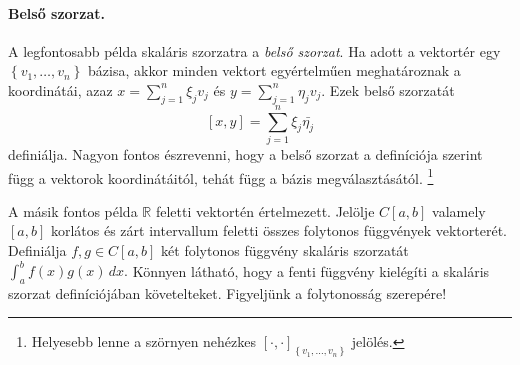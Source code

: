 \documentclass[a4paper, showtrims]{memoir}
\theoremstyle{plain}
\theoremstyle{remark}
\theoremstyle{definition}
\begin{document}
\paragraph{Belső szorzat.} A legfontosabb példa skaláris szorzatra a \emph{belső szorzat}.
Ha adott a vektortér egy $\left\{ v_1,\ldots,v_n \right\}$ bázisa,
akkor minden vektort egyértelműen meghatároznak a koordinátái,
azaz
\begin{math}
	x=\sum_{j=1}^n\xi_jv_j
\end{math}
és
\begin{math}
	y=\sum_{j=1}^n\eta_jv_j.
\end{math}
Ezek belső szorzatát
\begin{displaymath}
	\left[ x,y \right]=\sum_{j=1}^n\xi_j\bar{\eta_j}
\end{displaymath}
definiálja.
Nagyon fontos észrevenni,
hogy a belső szorzat a definíciója szerint függ a vektorok koordinátáitól,
tehát függ a bázis megválasztásától.%
\footnote{
	Helyesebb lenne a szörnyen nehézkes
	$\left[ \cdot,\cdot \right]_{\left\{ v_1,\ldots,v_n \right\}}$ jelölés.
}

A másik fontos példa $\mathbb{R}$ feletti vektortén értelmezett.
Jelölje $C\left[ a,b \right]$ valamely $\left[ a,b \right]$ korlátos és zárt intervallum feletti összes folytonos függvények vektorterét.
Definiálja $f,g\in C\left[ a,b \right]$ két folytonos függvény skaláris szorzatát
\begin{math}
	\int_{a}^{b}f\left( x \right)g\left( x \right)\,dx.
\end{math}
Könnyen látható, hogy a fenti függvény kielégíti a skaláris szorzat definíciójában követelteket.
Figyeljünk a folytonosság szerepére!
\end{document}
